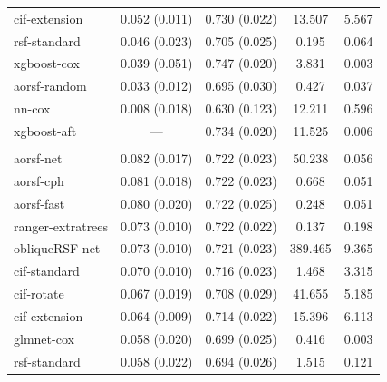 \documentclass{article}\usepackage[]{graphicx}\usepackage[]{xcolor}
\newenvironment{knitrout}{}{} %
\begin{document}
\begin{knitrout}
\begin{longtable}[t]{lcccc}
\hspace{1em}cif-extension & 0.052 (0.011) & 0.730 (0.022) & 13.507 & 5.567\\
\hspace{1em}rsf-standard & 0.046 (0.023) & 0.705 (0.025) & 0.195 & 0.064\\
\hspace{1em}xgboost-cox & 0.039 (0.051) & 0.747 (0.020) & 3.831 & 0.003\\
\hspace{1em}aorsf-random & 0.033 (0.012) & 0.695 (0.030) & 0.427 & 0.037\\
\hspace{1em}nn-cox & 0.008 (0.018) & 0.630 (0.123) & 12.211 & 0.596\\
\hspace{1em}xgboost-aft & --- & 0.734 (0.020) & 11.525 & 0.006\\
\addlinespace[0.3em]
\multicolumn{5}{l}{\textit{\textbf{GUIDE-IT; HF hospitalization, n = 894, p = 59}}}\\
\hline
\hspace{1em}aorsf-net & 0.082 (0.017) & 0.722 (0.023) & 50.238 & 0.056\\
\hspace{1em}aorsf-cph & 0.081 (0.018) & 0.722 (0.023) & 0.668 & 0.051\\
\hspace{1em}aorsf-fast & 0.080 (0.020) & 0.722 (0.025) & 0.248 & 0.051\\
\hspace{1em}ranger-extratrees & 0.073 (0.010) & 0.722 (0.022) & 0.137 & 0.198\\
\hspace{1em}obliqueRSF-net & 0.073 (0.010) & 0.721 (0.023) & 389.465 & 9.365\\
\hspace{1em}cif-standard & 0.070 (0.010) & 0.716 (0.023) & 1.468 & 3.315\\
\hspace{1em}cif-rotate & 0.067 (0.019) & 0.708 (0.029) & 41.655 & 5.185\\
\hspace{1em}cif-extension & 0.064 (0.009) & 0.714 (0.022) & 15.396 & 6.113\\
\hspace{1em}glmnet-cox & 0.058 (0.020) & 0.699 (0.025) & 0.416 & 0.003\\
\hspace{1em}rsf-standard & 0.058 (0.022) & 0.694 (0.026) & 1.515 & 0.121\\

\end{longtable}
\end{knitrout}
\end{document}
